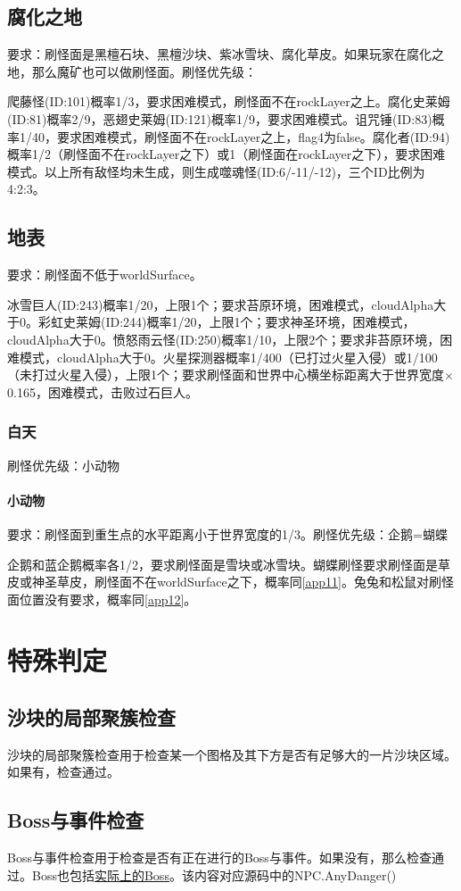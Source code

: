 \subsection{腐化之地}
要求：刷怪面是黑檀石块、黑檀沙块、紫冰雪块、腐化草皮。如果玩家在腐化之地，那么魔矿也可以做刷怪面。刷怪优先级：

爬藤怪(ID:101)概率1/3，要求困难模式，刷怪面不在rockLayer之上。腐化史莱姆(ID:81)概率2/9，恶翅史莱姆(ID:121)概率1/9，要求困难模式。诅咒锤(ID:83)概率1/40，要求困难模式，刷怪面不在rockLayer之上，flag4为false。腐化者(ID:94)概率1/2（刷怪面不在rockLayer之下）或1（刷怪面在rockLayer之下），要求困难模式。以上所有敌怪均未生成，则生成噬魂怪(ID:6/-11/-12)，三个ID比例为4:2:3。

\subsection{地表}
要求：刷怪面不低于worldSurface。

冰雪巨人(ID:243)概率1/20，上限1个；要求苔原环境，困难模式，cloudAlpha大于0。彩虹史莱姆(ID:244)概率1/20，上限1个；要求神圣环境，困难模式，cloudAlpha大于0。愤怒雨云怪(ID:250)概率1/10，上限2个；要求非苔原环境，困难模式，cloudAlpha大于0。火星探测器概率1/400（已打过火星入侵）或1/100（未打过火星入侵），上限1个；要求刷怪面和世界中心横坐标距离大于世界宽度$\times$0.165，困难模式，击败过石巨人。

\subsubsection{白天}
刷怪优先级：小动物

\paragraph{小动物}
要求：刷怪面到重生点的水平距离小于世界宽度的1/3。刷怪优先级：企鹅=蝴蝶

企鹅和蓝企鹅概率各1/2，要求刷怪面是雪块或冰雪块。蝴蝶刷怪要求刷怪面是草皮或神圣草皮，刷怪面不在worldSurface之下，概率同\autoref{app11}。兔兔和松鼠对刷怪面位置没有要求，概率同\autoref{app12}。

\section{特殊判定}
\subsection{沙块的局部聚簇检查}
沙块的局部聚簇检查用于检查某一个图格及其下方是否有足够大的一片沙块区域。如果有，检查通过。

\subsection{Boss与事件检查}
Boss与事件检查用于检查是否有正在进行的Boss与事件。如果没有，那么检查通过。Boss也包括\hyperref[app10]{实际上的Boss}。该内容对应源码中的NPC.AnyDanger()
